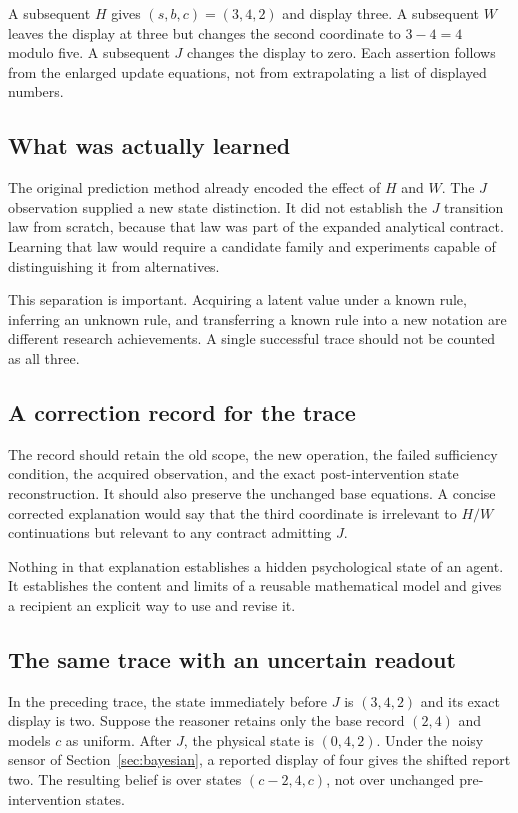 \documentclass[11pt,letterpaper]{article}
\theoremstyle{plain}
\theoremstyle{definition}
\begin{document}
A subsequent $H$ gives $(s,b,c)=(3,4,2)$ and display three. A subsequent $W$ leaves the display at three but changes the second coordinate to $3-4=4$ modulo five. A subsequent $J$ changes the display to zero. Each assertion follows from the enlarged update equations, not from extrapolating a list of displayed numbers.

\subsection{What was actually learned}
The original prediction method already encoded the effect of $H$ and $W$. The $J$ observation supplied a new state distinction. It did not establish the $J$ transition law from scratch, because that law was part of the expanded analytical contract. Learning that law would require a candidate family and experiments capable of distinguishing it from alternatives.

This separation is important. Acquiring a latent value under a known rule, inferring an unknown rule, and transferring a known rule into a new notation are different research achievements. A single successful trace should not be counted as all three.

\subsection{A correction record for the trace}
The record should retain the old scope, the new operation, the failed sufficiency condition, the acquired observation, and the exact post-intervention state reconstruction. It should also preserve the unchanged base equations. A concise corrected explanation would say that the third coordinate is irrelevant to $H/W$ continuations but relevant to any contract admitting $J$.

Nothing in that explanation establishes a hidden psychological state of an agent. It establishes the content and limits of a reusable mathematical model and gives a recipient an explicit way to use and revise it.

\subsection{The same trace with an uncertain readout}
In the preceding trace, the state immediately before $J$ is $(3,4,2)$ and its exact display is two. Suppose the reasoner retains only the base record $(2,4)$ and models $c$ as uniform. After $J$, the physical state is $(0,4,2)$. Under the noisy sensor of Section~\ref{sec:bayesian}, a reported display of four gives the shifted report two. The resulting belief is over states $(c-2,4,c)$, not over unchanged pre-intervention states.
\end{document}

